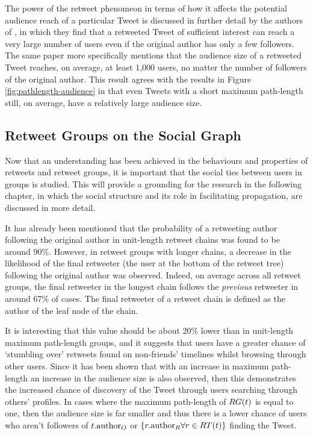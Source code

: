 The power of the retweet phenomeon in terms of how it affects the potential audience reach of a particular Tweet is discussed in further detail by the authors of \cite{kwak10}, in which they find that a retweeted Tweet of sufficient interest can reach a very large number of users even if the original author has only a few followers. The same paper more specifically mentions that the audience size of a retweeted Tweet reaches, on average, at least 1,000 users, no matter the number of followers of the original author. This result agrees with the results in Figure \ref{fig:pathlength-audience} in that even Tweets with a short maximum path-length still, on average, have a relatively large audience size.


\subsection{Retweet Groups on the Social Graph}
\label{section:retweets_graph}
Now that an understanding has been achieved in the behaviours and properties of retweets and retweet groups, it is important that the social ties between users in groups is studied. This will provide a grounding for the research in the following chapter, in which the social structure and its role in facilitating propagation, are discussed in more detail.

It has already been mentioned that the probability of a retweeting author following the original author in unit-length retweet chains was found to be around 90\%. However, in retweet groups with longer chains, a decrease in the likelihood of the final retweeter (the user at the bottom of the retweet tree) following the original author was observed. Indeed, on average across all retweet groups, the final retweeter in the longest chain follows the \textit{previous} retweeter in around 67\% of cases. The final retweeter of a retweet chain is defined as the author of the leaf node of the chain.


It is interesting that this value should be about 20\% lower than in unit-length maximum path-length groups, and it suggests that users have a greater chance of `stumbling over' retweets found on non-friends' timelines whilst browsing through other users. Since it has been shown that with an increase in maximum path-length an increase in the audience size is also observed, then this demonstrates the increased chance of discovery of the Tweet through users searching through others' profiles. In cases where the maximum path-length of $RG(t)$ is equal to one, then the audience size is far smaller and thus there is a lower chance of users who aren't followers of $t.\textrm{author}_O$ or $\left\{r.\textrm{author}_R \forall r \in RT(t)\right\}$ finding the Tweet.

